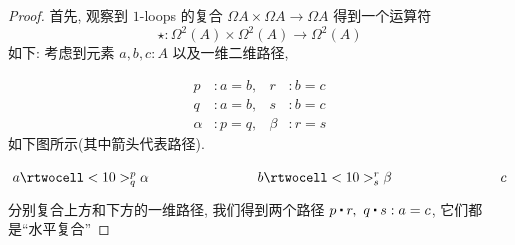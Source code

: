 \begin{proof}
    首先, 观察到 $1$-loops 的复合 $\Omega A\times \Omega A\to \Omega A$ 得到一个运算符
    \[
        \star : \Omega^2(A)\times \Omega^2(A)\to \Omega^2(A)
    \]
    如下: 考虑到元素 $a, b, c : A$ 以及一维二维路径, %

    \begin{align*}
        p &: a = b, &r &: b = c \\
        q &: a = b, &s &: b = c \\
        \alpha &: p = q, &\beta &: r = s
    \end{align*}
%
    如下图所示(其中箭头代表路径). %

    \[
        \xymatrix@+5em{
                {a} \rtwocell<10>^p_q{\alpha}
            &
                {b} \rtwocell<10>^r_s{\beta}
            &
                {c}
        }
    \]
    分别复合上方和下方的一维路径, 我们得到两个路径 $p\ct r,\ q\ct s : a = c$, 它们都是``水平复合'' %


\end{proof}
